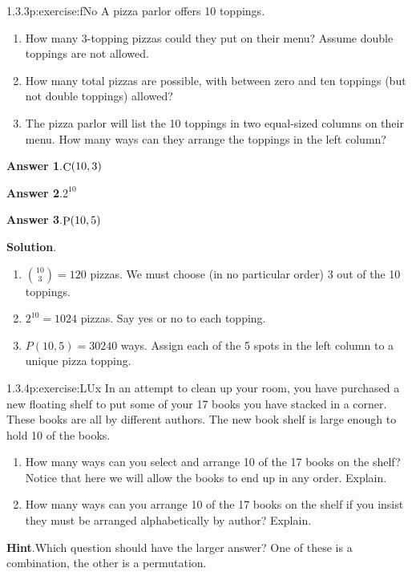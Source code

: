 \documentclass[twoside,11pt,]{book}
\newcommand{\blocktitlefont}{\relax}
\numberwithin{equation}{chapter}
\begin{document}
\begin{divisionsolution}{1.3.3}{}{p:exercise:fNo}%
A pizza parlor offers 10 toppings.%
\begin{enumerate}[label=(\alph*)]
\item{}How many 3-topping pizzas could they put on their menu? Assume double toppings are not allowed.%
\item{}How many total pizzas are possible, with between zero and ten toppings (but not double toppings) allowed?%
\item{}The pizza parlor will list the 10 toppings in two equal-sized columns on their menu. How many ways can they arrange the toppings in the left column?%
\end{enumerate}
%
\par\smallskip%
\noindent\textbf{\blocktitlefont Answer 1}.\quad{}\(\mathop{\rm C}\nolimits\!\left(10,3\right)\)%
\par\smallskip%
\noindent\textbf{\blocktitlefont Answer 2}.\quad{}\(2^{10}\)%
\par\smallskip%
\noindent\textbf{\blocktitlefont Answer 3}.\quad{}\(\mathop{\rm P}\nolimits\!\left(10,5\right)\)%
\par\smallskip%
\noindent\textbf{\blocktitlefont Solution}.\quad{}%
\begin{enumerate}[label=(\alph*)]
\item{}\({10 \choose 3} = 120\) pizzas. We must choose (in no particular order) 3 out of the 10 toppings.%
\item{}\(2^{10} = 1024\) pizzas. Say yes or no to each topping.%
\item{}\(P(10,5) = 30240\) ways. Assign each of the 5 spots in the left column to a unique pizza topping.%
\end{enumerate}
%
\end{divisionsolution}%
\begin{divisionsolution}{1.3.4}{}{p:exercise:LUx}%
In an attempt to clean up your room, you have purchased a new floating shelf to put some of your 17 books you have stacked in a corner. These books are all by different authors. The new book shelf is large enough to hold 10 of the books.%
\begin{enumerate}[label=(\alph*)]
\item{}How many ways can you select and arrange 10 of the 17 books on the shelf? Notice that here we will allow the books to end up in any order. Explain.%
\item{}How many ways can you arrange 10 of the 17 books on the shelf if you insist they must be arranged alphabetically by author? Explain.%
\end{enumerate}
%
\par\smallskip%
\noindent\textbf{\blocktitlefont Hint}.\quad{}Which question should have the larger answer?  One of these is a combination, the other is a permutation.%
\end{divisionsolution}%
\end{document}

